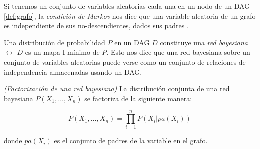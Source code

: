 Si tenemos un conjunto de variables aleatorias cada una en un nodo de un DAG \ref{def:grafo}, la {\em condición 
de Markov} nos dice que una variable aleatoria de un grafo es independiente de sus no-descendientes, dados 
sus padres \cite{markov-assumption}. 

Una distribución de probabilidad $P$ en un DAG $D$ constituye una {\em red bayesiana} $\leftrightarrow$ $D$ es un 
mapa-I mínimo de $P$. Esto nos dice que una red bayesiana sobre un conjunto de variables aleatorias puede verse 
como un conjunto de relaciones de independencia almacenadas usando un DAG.


\begin{teorema}\emph{(Factorización de una red bayesiana)} 
La distribución conjunta de una red bayesiana $P(X_1, \dots, X_n)$ se factoriza de la siguiente manera:

$$P(X_1, \dots, X_n) = \prod_{i=1}^n P(X_i|pa(X_i))$$

donde $pa(X_i)$ es el conjunto de padres de la variable en el grafo. 
\end{teorema}

